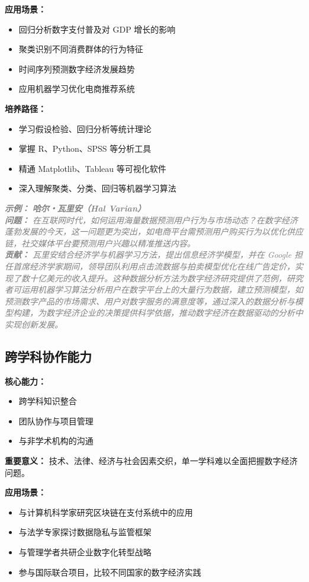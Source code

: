 \documentclass[lang=cn,12pt,a4paper]{elegantpaper}
\newcommand{\skillexample}[1]{\smallskip\noindent\textcolor{gray}{\textit{\footnotesize\textbf{示例：}} \textit{\footnotesize #1}}}
\begin{document}
\textbf {应用场景：}
\begin {itemize}
\item 回归分析数字支付普及对 GDP 增长的影响
\item 聚类识别不同消费群体的行为特征
\item 时间序列预测数字经济发展趋势
\item 应用机器学习优化电商推荐系统
\end {itemize}

\textbf {培养路径：}
\begin {itemize}
\item 学习假设检验、回归分析等统计理论
\item 掌握 R、Python、SPSS 等分析工具
\item 精通 Matplotlib、Tableau 等可视化软件
\item 深入理解聚类、分类、回归等机器学习算法
\end {itemize}

\skillexample {
\textbf {哈尔・瓦里安（Hal Varian）}\\
\textbf {问题：} 在互联网时代，如何运用海量数据预测用户行为与市场动态？在数字经济蓬勃发展的今天，这一问题更为突出，如电商平台需预测用户购买行为以优化供应链，社交媒体平台要预测用户兴趣以精准推送内容。\\
\textbf {贡献：} 瓦里安结合经济学与机器学习方法，提出信息经济学模型，并在 Google 担任首席经济学家期间，领导团队利用点击流数据与拍卖模型优化在线广告定价，实现了数十亿美元的收入提升。这种数据分析方法为数字经济研究提供了范例，研究者可运用机器学习算法分析用户在数字平台上的大量行为数据，建立预测模型，如预测数字产品的市场需求、用户对数字服务的满意度等，通过深入的数据分析与模型构建，为数字经济企业的决策提供科学依据，推动数字经济在数据驱动的分析中实现创新发展。
}

\subsection {跨学科协作能力}\label {sec:interdisciplinary}
\textbf {核心能力：}
\begin {itemize}
\item 跨学科知识整合
\item 团队协作与项目管理
\item 与非学术机构的沟通
\end {itemize}

\textbf {重要意义：} 技术、法律、经济与社会因素交织，单一学科难以全面把握数字经济问题。

\textbf {应用场景：}
\begin {itemize}
\item 与计算机科学家研究区块链在支付系统中的应用
\item 与法学专家探讨数据隐私与监管框架
\item 与管理学者共研企业数字化转型战略
\item 参与国际联合项目，比较不同国家的数字经济实践
\end {itemize}
\end{document}
